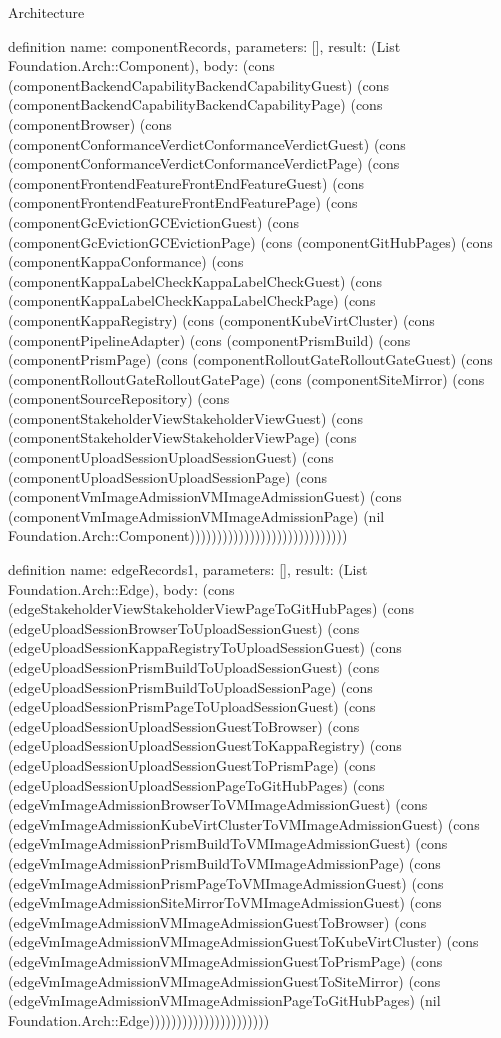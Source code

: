 \begin{lexlean}{Architecture}
\begin{semanticmodule}
definition{
  name: componentRecords,
  parameters: [],
  result: (List Foundation.Arch::Component),
  body: (cons (componentBackendCapabilityBackendCapabilityGuest) (cons (componentBackendCapabilityBackendCapabilityPage) (cons (componentBrowser) (cons (componentConformanceVerdictConformanceVerdictGuest) (cons (componentConformanceVerdictConformanceVerdictPage) (cons (componentFrontendFeatureFrontEndFeatureGuest) (cons (componentFrontendFeatureFrontEndFeaturePage) (cons (componentGcEvictionGCEvictionGuest) (cons (componentGcEvictionGCEvictionPage) (cons (componentGitHubPages) (cons (componentKappaConformance) (cons (componentKappaLabelCheckKappaLabelCheckGuest) (cons (componentKappaLabelCheckKappaLabelCheckPage) (cons (componentKappaRegistry) (cons (componentKubeVirtCluster) (cons (componentPipelineAdapter) (cons (componentPrismBuild) (cons (componentPrismPage) (cons (componentRolloutGateRolloutGateGuest) (cons (componentRolloutGateRolloutGatePage) (cons (componentSiteMirror) (cons (componentSourceRepository) (cons (componentStakeholderViewStakeholderViewGuest) (cons (componentStakeholderViewStakeholderViewPage) (cons (componentUploadSessionUploadSessionGuest) (cons (componentUploadSessionUploadSessionPage) (cons (componentVmImageAdmissionVMImageAdmissionGuest) (cons (componentVmImageAdmissionVMImageAdmissionPage) (nil Foundation.Arch::Component)))))))))))))))))))))))))))))
}

definition{
  name: edgeRecords1,
  parameters: [],
  result: (List Foundation.Arch::Edge),
  body: (cons (edgeStakeholderViewStakeholderViewPageToGitHubPages) (cons (edgeUploadSessionBrowserToUploadSessionGuest) (cons (edgeUploadSessionKappaRegistryToUploadSessionGuest) (cons (edgeUploadSessionPrismBuildToUploadSessionGuest) (cons (edgeUploadSessionPrismBuildToUploadSessionPage) (cons (edgeUploadSessionPrismPageToUploadSessionGuest) (cons (edgeUploadSessionUploadSessionGuestToBrowser) (cons (edgeUploadSessionUploadSessionGuestToKappaRegistry) (cons (edgeUploadSessionUploadSessionGuestToPrismPage) (cons (edgeUploadSessionUploadSessionPageToGitHubPages) (cons (edgeVmImageAdmissionBrowserToVMImageAdmissionGuest) (cons (edgeVmImageAdmissionKubeVirtClusterToVMImageAdmissionGuest) (cons (edgeVmImageAdmissionPrismBuildToVMImageAdmissionGuest) (cons (edgeVmImageAdmissionPrismBuildToVMImageAdmissionPage) (cons (edgeVmImageAdmissionPrismPageToVMImageAdmissionGuest) (cons (edgeVmImageAdmissionSiteMirrorToVMImageAdmissionGuest) (cons (edgeVmImageAdmissionVMImageAdmissionGuestToBrowser) (cons (edgeVmImageAdmissionVMImageAdmissionGuestToKubeVirtCluster) (cons (edgeVmImageAdmissionVMImageAdmissionGuestToPrismPage) (cons (edgeVmImageAdmissionVMImageAdmissionGuestToSiteMirror) (cons (edgeVmImageAdmissionVMImageAdmissionPageToGitHubPages) (nil Foundation.Arch::Edge))))))))))))))))))))))
}


\end{semanticmodule}
\end{lexlean}
